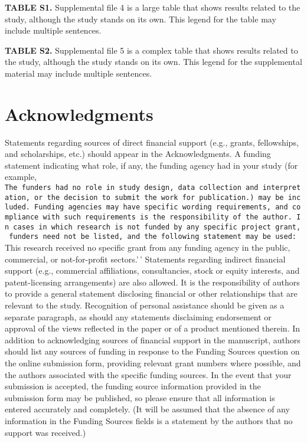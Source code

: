 \documentclass[
  lineno]{asm}
\begin{document}
\textbf{TABLE S1.} Supplemental file 4 is a large table that shows
results related to the study, although the study stands on its own. This
legend for the table may include multiple sentences.

\textbf{TABLE S2.} Supplemental file 5 is a complex table that shows
results related to the study, although the study stands on its own. This
legend for the supplemental material may include multiple sentences.

\section{Acknowledgments}\label{acknowledgments}

Statements regarding sources of direct financial support (e.g., grants,
fellowships, and scholarships, etc.) should appear in the
Acknowledgments. A funding statement indicating what role, if any, the
funding agency had in your study (for example,
\texttt{The\ funders\ had\ no\ role\ in\ study\ design,\ data\ collection\ and\ interpretation,\ or\ the\ decision\ to\ submit\ the\ work\ for\ publication.\textquotesingle{}\textquotesingle{})\ may\ be\ included.\ Funding\ agencies\ may\ have\ specific\ wording\ requirements,\ and\ compliance\ with\ such\ requirements\ is\ the\ responsibility\ of\ the\ author.\ In\ cases\ in\ which\ research\ is\ not\ funded\ by\ any\ specific\ project\ grant,\ funders\ need\ not\ be\ listed,\ and\ the\ following\ statement\ may\ be\ used:}This
research received no specific grant from any funding agency in the
public, commercial, or not-for-profit sectors.'\,' Statements regarding
indirect financial support (e.g., commercial affiliations,
consultancies, stock or equity interests, and patent-licensing
arrangements) are also allowed. It is the responsibility of authors to
provide a general statement disclosing financial or other relationships
that are relevant to the study. Recognition of personal assistance
should be given as a separate paragraph, as should any statements
disclaiming endorsement or approval of the views reflected in the paper
or of a product mentioned therein. In addition to acknowledging sources
of financial support in the manuscript, authors should list any sources
of funding in response to the Funding Sources question on the online
submission form, providing relevant grant numbers where possible, and
the authors associated with the specific funding sources. In the event
that your submission is accepted, the funding source information
provided in the submission form may be published, so please ensure that
all information is entered accurately and completely. (It will be
assumed that the absence of any information in the Funding Sources
fields is a statement by the authors that no support was received.)
\end{document}
